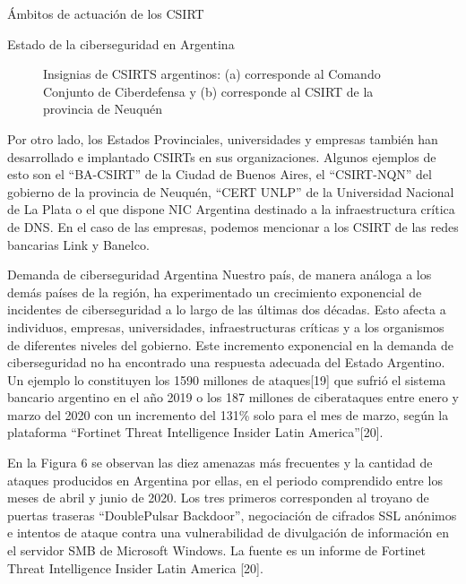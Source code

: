 \begin{section}{Ámbitos de actuación de los CSIRT}
\begin{subsection}{Estado de la ciberseguridad en Argentina}
\begin{figure}[H]
            \quad
            \caption{Insignias de CSIRTS argentinos: (a) corresponde al Comando Conjunto de Ciberdefensa y (b) corresponde al CSIRT de la provincia de Neuquén}
            \label{fig:ciberdef_nqn}
        \end{figure}
        \FloatBarrier
        Por otro lado, los Estados Provinciales, universidades y empresas también han desarrollado e implantado CSIRTs en sus organizaciones. Algunos ejemplos de esto son el “BA-CSIRT”\cite{ba_csirt} de la Ciudad de Buenos Aires, el “CSIRT-NQN”\cite{nqn_csirt} del gobierno de la provincia de Neuquén, “CERT UNLP” \cite{unlp_cert} de la Universidad Nacional de La Plata o el que dispone NIC Argentina \cite{nic_arg} destinado a la infraestructura crítica de DNS. En el caso de las empresas, podemos mencionar a los CSIRT de las redes bancarias Link \cite{red_link} y Banelco\cite{banelco}.
            \begin{subsubsection}{Demanda de ciberseguridad Argentina}
            Nuestro país, de manera análoga a los demás países de la región, ha experimentado un crecimiento exponencial de incidentes de ciberseguridad a lo largo de las últimas dos décadas. Esto afecta a individuos, empresas, universidades, infraestructuras críticas y a los organismos de diferentes niveles del gobierno. Este incremento exponencial en la demanda de ciberseguridad no ha encontrado una respuesta adecuada del Estado Argentino. Un ejemplo lo constituyen los 1590 millones de ataques[19] que sufrió el sistema bancario argentino en el año 2019 o los 187 millones de ciberataques entre enero y marzo del 2020 con un incremento del 131\% solo para el mes de marzo, según la plataforma “Fortinet Threat Intelligence Insider Latin America”[20]. \par 
            En la Figura 6 se observan las diez amenazas más frecuentes y la cantidad de ataques producidos en Argentina por ellas, en el periodo comprendido entre los meses de abril y junio de 2020. Los tres primeros corresponden al troyano de puertas traseras “DoublePulsar Backdoor”, negociación de cifrados SSL anónimos e intentos de ataque contra una vulnerabilidad de divulgación de información en el servidor SMB de Microsoft Windows. La fuente es un informe de Fortinet Threat Intelligence Insider Latin America [20].\par

            \end{subsubsection}
        \end{subsection}
   \end{section}

